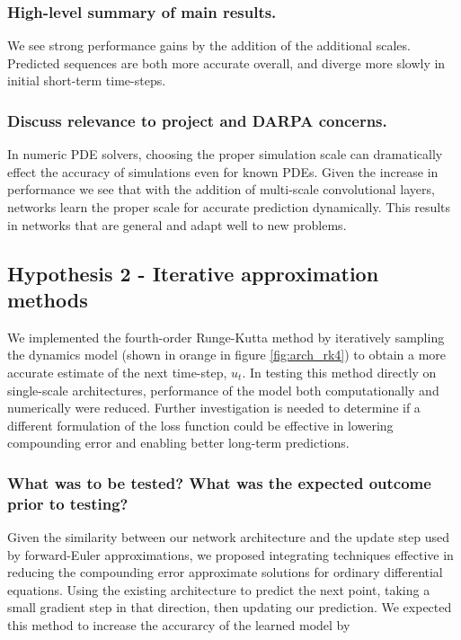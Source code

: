 \documentclass[12pt]{article}
\theoremstyle{plain}
\theoremstyle{remark}
\theoremstyle{definition}
\begin{document}
\subsubsection{High-level summary of main results.}
	We see strong performance gains by the addition of the additional scales. Predicted sequences are both more accurate overall, and diverge more slowly in initial short-term time-steps.  


\subsubsection{Discuss relevance to project and DARPA concerns.}
	In numeric PDE solvers, choosing the proper simulation scale can dramatically effect the accuracy of simulations even for known PDEs. Given the increase in performance we see that with the addition of multi-scale convolutional layers, networks learn the proper scale for accurate prediction dynamically. This results in networks that are general and adapt well to new problems.


\subsection{Hypothesis 2 - Iterative approximation methods}

 We implemented the fourth-order Runge-Kutta method by iteratively sampling the dynamics model (shown in orange in figure \ref{fig:arch_rk4}) to obtain a more accurate estimate of the next time-step, $u_t$. In testing this method directly on single-scale architectures, performance of the model both computationally and numerically were reduced. Further investigation is needed to determine if a different formulation of the loss function could be effective in lowering compounding error and enabling better long-term predictions. 

\subsubsection{What was to be tested? What was the expected outcome prior to testing?}
	Given the similarity between our network architecture and the update step used by forward-Euler approximations, we proposed integrating techniques effective in reducing the compounding error approximate solutions for ordinary differential equations. Using the existing architecture to predict the next point, taking a small gradient step in that direction, then updating our prediction. We expected this method to increase the accurarcy of the learned model by 
\end{document}
